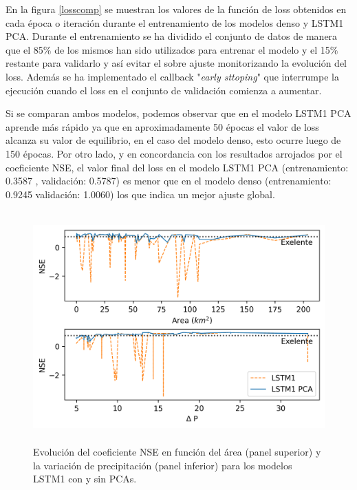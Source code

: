 En la figura \ref{losscomp} se muestran los valores de la función de loss obtenidos en cada época o iteración durante el entrenamiento
de los modelos denso y LSTM1 PCA.  Durante el entrenamiento se ha dividido el conjunto de datos de manera que el 
85$\%$ de los mismos han sido utilizados para entrenar el modelo y el 15$\%$ restante para validarlo y así evitar el sobre ajuste
monitorizando la evolución del loss. Además se ha implementado el callback "\textit{early sttoping}" que 
interrumpe la ejecución cuando el loss en el conjunto de validación comienza a aumentar.

Si se comparan ambos modelos, podemos observar que
en el modelo LSTM1 PCA aprende más rápido ya que en aproximadamente 50 épocas el valor de loss alcanza su valor de equilibrio, 
en el caso del modelo denso, esto ocurre luego de 150 épocas. Por otro lado, y en concordancia con los resultados
arrojados por el coeficiente NSE, el valor final del loss en el modelo LSTM1 PCA (entrenamiento: 0.3587 , validación: 0.5787)
es menor que en el modelo denso (entrenamiento: 0.9245 validación: 1.0060) los que indica un mejor ajuste global. 


  \begin{figure}[h!]
    \begin{center}
      \includegraphics[height=3.5in]{Figures/NSE/comp_NSE_consinPCA.png}
      \caption{ Evolución del coeficiente NSE en función del área (panel superior) y la variación de precipitación 
      (panel inferior) para los modelos LSTM1 con y sin PCAs.}
      \label{NSEs_Area_prec}
    \end{center}
  \end{figure}



